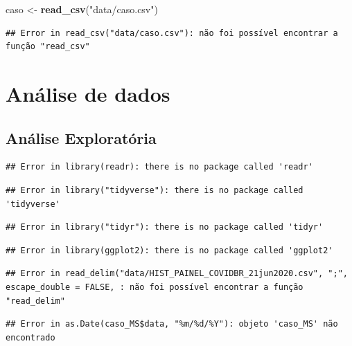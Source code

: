 \documentclass[
  oneside]{book}
\newenvironment{Shaded}{\begin{snugshade}}{\end{snugshade}}
\newcommand{\KeywordTok}[1]{\textcolor[rgb]{0.13,0.29,0.53}{\textbf{#1}}}
\newcommand{\NormalTok}[1]{#1}
\newcommand{\StringTok}[1]{\textcolor[rgb]{0.31,0.60,0.02}{#1}}
\begin{document}
\begin{Shaded}
\begin{Highlighting}[]
\NormalTok{caso <-}\StringTok{ }\KeywordTok{read_csv}\NormalTok{(}\StringTok{"data/caso.csv"}\NormalTok{)}
\end{Highlighting}
\end{Shaded}

\begin{verbatim}
## Error in read_csv("data/caso.csv"): não foi possível encontrar a função "read_csv"
\end{verbatim}

\hypertarget{anuxe1lise-de-dados}{%
\section{Análise de dados}\label{anuxe1lise-de-dados}}

\hypertarget{anuxe1lise-exploratuxf3ria}{%
\subsection{Análise Exploratória}\label{anuxe1lise-exploratuxf3ria}}

\begin{verbatim}
## Error in library(readr): there is no package called 'readr'
\end{verbatim}

\begin{verbatim}
## Error in library("tidyverse"): there is no package called 'tidyverse'
\end{verbatim}

\begin{verbatim}
## Error in library("tidyr"): there is no package called 'tidyr'
\end{verbatim}

\begin{verbatim}
## Error in library(ggplot2): there is no package called 'ggplot2'
\end{verbatim}

\begin{verbatim}
## Error in read_delim("data/HIST_PAINEL_COVIDBR_21jun2020.csv", ";", escape_double = FALSE, : não foi possível encontrar a função "read_delim"
\end{verbatim}

\begin{verbatim}
## Error in as.Date(caso_MS$data, "%m/%d/%Y"): objeto 'caso_MS' não encontrado
\end{verbatim}
\end{document}
